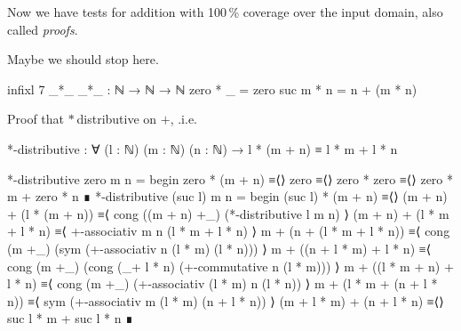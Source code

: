 Now we have tests for addition with 100\,\% coverage over the input domain,
also called \emph{proofs}.

Maybe we should stop here.

\begin{code}
infixl 7 _*_
_*_ : ℕ → ℕ → ℕ
zero * _ = zero
suc m * n = n + (m * n)
\end{code}

\begin{exercise}
Proof that $*$ distributive on $+$, .i.e.

\begin{code}
*-distributive : ∀ (l : ℕ) (m : ℕ) (n : ℕ)
  → l * (m + n) ≡ l * m + l * n
\end{code}
\end{exercise}

\begin{code}
*-distributive zero m n =
  begin
    zero * (m + n)
  ≡⟨⟩
    zero
  ≡⟨⟩
    zero * zero
  ≡⟨⟩
    zero * m + zero * n
  ∎
*-distributive (suc l) m n =
  begin
    (suc l) * (m + n)
  ≡⟨⟩
    (m + n) + (l * (m + n))
  ≡⟨ cong ((m + n) +_) (*-distributive l m n) ⟩
    (m + n) + (l * m + l * n)
  ≡⟨ +-associativ m n (l * m + l * n) ⟩
    m + (n + (l * m + l * n))
  ≡⟨ cong (m +_) (sym (+-associativ n (l * m) (l * n))) ⟩
    m + ((n + l * m) + l * n)
  ≡⟨ cong (m +_) (cong (_+ l * n) (+-commutative n (l * m))) ⟩
    m + ((l * m + n) + l * n)
  ≡⟨ cong (m +_) (+-associativ (l * m) n (l * n)) ⟩
    m + (l * m + (n + l * n))
  ≡⟨ sym (+-associativ  m (l * m) (n + l * n)) ⟩
    (m + l * m) + (n + l * n)
  ≡⟨⟩
    suc l * m + suc l * n
  ∎
\end{code}
